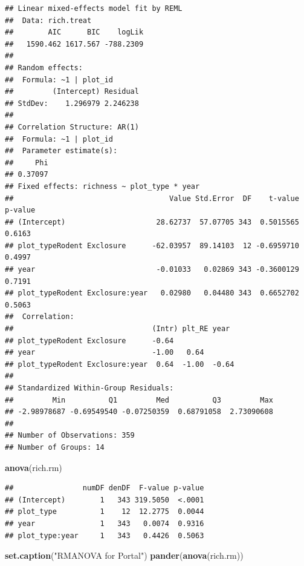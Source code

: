 \documentclass[]{article}
\newenvironment{Shaded}{\begin{snugshade}}{\end{snugshade}}
\newcommand{\KeywordTok}[1]{\textcolor[rgb]{0.13,0.29,0.53}{\textbf{{#1}}}}
\newcommand{\StringTok}[1]{\textcolor[rgb]{0.31,0.60,0.02}{{#1}}}
\newcommand{\NormalTok}[1]{{#1}}
\begin{document}
\begin{verbatim}
## Linear mixed-effects model fit by REML
##  Data: rich.treat 
##        AIC      BIC    logLik
##   1590.462 1617.567 -788.2309
## 
## Random effects:
##  Formula: ~1 | plot_id
##         (Intercept) Residual
## StdDev:    1.296979 2.246238
## 
## Correlation Structure: AR(1)
##  Formula: ~1 | plot_id 
##  Parameter estimate(s):
##     Phi 
## 0.37097 
## Fixed effects: richness ~ plot_type * year 
##                                    Value Std.Error  DF    t-value p-value
## (Intercept)                     28.62737  57.07705 343  0.5015565  0.6163
## plot_typeRodent Exclosure      -62.03957  89.14103  12 -0.6959710  0.4997
## year                            -0.01033   0.02869 343 -0.3600129  0.7191
## plot_typeRodent Exclosure:year   0.02980   0.04480 343  0.6652702  0.5063
##  Correlation: 
##                                (Intr) plt_RE year 
## plot_typeRodent Exclosure      -0.64              
## year                           -1.00   0.64       
## plot_typeRodent Exclosure:year  0.64  -1.00  -0.64
## 
## Standardized Within-Group Residuals:
##         Min          Q1         Med          Q3         Max 
## -2.98978687 -0.69549540 -0.07250359  0.68791058  2.73090608 
## 
## Number of Observations: 359
## Number of Groups: 14
\end{verbatim}

\begin{Shaded}
\begin{Highlighting}[]
\KeywordTok{anova}\NormalTok{(rich.rm)}
\end{Highlighting}
\end{Shaded}

\begin{verbatim}
##                numDF denDF  F-value p-value
## (Intercept)        1   343 319.5050  <.0001
## plot_type          1    12  12.2775  0.0044
## year               1   343   0.0074  0.9316
## plot_type:year     1   343   0.4426  0.5063
\end{verbatim}

\begin{Shaded}
\begin{Highlighting}[]
\KeywordTok{set.caption}\NormalTok{(}\StringTok{"RMANOVA for Portal"}\NormalTok{)}
\KeywordTok{pander}\NormalTok{(}\KeywordTok{anova}\NormalTok{(rich.rm))}
\end{Highlighting}
\end{Shaded}
\end{document}

